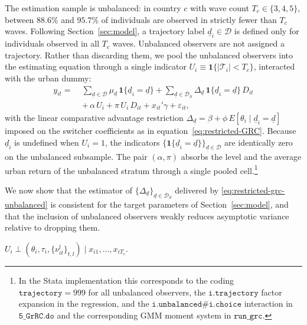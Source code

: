The estimation sample is unbalanced: in country $c$ with wave count
$T_c \in\{3,4,5\}$, between $88.6\%$ and $95.7\%$ of individuals are
observed in strictly fewer than $T_c$ waves. Following
Section~\ref{sec:model}, a trajectory label $\underline d_i\in\mathcal{D}$
is defined only for individuals observed in all $T_c$ waves. Unbalanced
observers are not assigned a trajectory. Rather than discarding them,
we pool the unbalanced observers into the estimating equation through
a single indicator $U_i\equiv\mathbf{1}\{|\mathcal{T}_i|<T_c\}$,
interacted with the urban dummy:
\begin{equation}
\label{eq:restricted-grc-unbalanced}
\begin{aligned}
y_{it} = \; &
\sum_{\underline d \in \mathcal{D}} \mu_{\underline d}\,
\mathbf{1}\{\underline d_i=\underline d\}
+
\sum_{\underline d \in \mathcal{D}_S} \Delta_{\underline d}\,
\mathbf{1}\{\underline d_i=\underline d\}\, D_{it} \\
& +\, \alpha\, U_i
+ \pi\, U_i\, D_{it}
+ x_{it}'\gamma
+ \varepsilon_{it},
\end{aligned}
\end{equation}
with the linear comparative advantage restriction
$\Delta_{\underline d}=\beta+\phi\,E[\theta_i\mid\underline
d_i=\underline d]$ imposed on the switcher coefficients as in
equation~\eqref{eq:restricted-GRC}. Because $\underline d_i$ is
undefined when $U_i=1$, the indicators $\{\mathbf{1}\{\underline
d_i=\underline d\}\}_{\underline d\in\mathcal{D}}$ are identically zero
on the unbalanced subsample. The pair $(\alpha, \pi)$ absorbs the
level and the average urban return of the unbalanced stratum through a
single pooled cell.\footnote{%
In the Stata implementation this corresponds to the coding
$\texttt{trajectory}=999$ for all unbalanced observers, the
$\texttt{i.trajectory}$ factor expansion in the regression, and the
$\texttt{i.unbalanced\#i.choice}$ interaction in
$\texttt{5\_GrRC.do}$ and the corresponding GMM moment system in
$\texttt{run\_grc}$.}

We now show that the estimator of $\{\Delta_{\underline
d}\}_{\underline d\in\mathcal{D}_S}$ delivered by
\eqref{eq:restricted-grc-unbalanced} is consistent for the target
parameters of Section~\ref{sec:model}, and that the inclusion of
unbalanced observers weakly reduces asymptotic variance relative to
dropping them.

\begin{assumption}
\label{ass:mar}
$U_i \perp (\theta_i, \tau_i, \{\nu_{it}^l\}_{t,l})\mid x_{i1},\dots,x_{iT_c}$.
\end{assumption}

